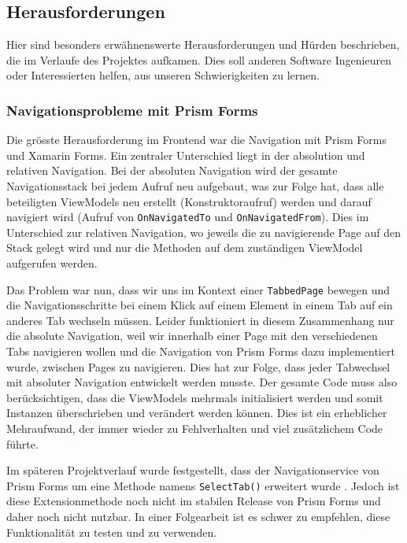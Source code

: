 \subsection{Herausforderungen}
Hier sind besonders erwähnenswerte Herausforderungen und Hürden beschrieben, die im Verlaufe des Projektes aufkamen. Dies soll anderen Software Ingenieuren oder Interessierten helfen, aus unseren Schwierigkeiten zu lernen. 


\subsubsection{Navigationsprobleme mit Prism Forms}\label{subsub:navigation}

Die grösste Herausforderung im Frontend war die Navigation mit Prism Forms und Xamarin Forms. Ein zentraler Unterschied liegt in der absolution und relativen Navigation. Bei der absoluten Navigation wird der gesamte Navigationsstack bei jedem Aufruf neu aufgebaut, was zur Folge hat, dass alle beteiligten ViewModels neu erstellt (Konstruktoraufruf) werden und darauf navigiert wird (Aufruf von \texttt{OnNavigatedTo} und \texttt{OnNavigatedFrom}). Dies im Unterschied zur relativen Navigation, wo jeweils die zu navigierende Page auf den Stack gelegt wird und nur die Methoden auf dem zuständigen ViewModel aufgerufen werden. 

Das Problem war nun, dass wir uns im Kontext einer \texttt{TabbedPage} bewegen und die Navigationsschritte bei einem Klick auf einem Element in einem Tab auf ein anderes Tab wechseln müssen. Leider funktioniert in diesem Zusammenhang nur die absolute Navigation, weil wir innerhalb einer Page mit den verschiedenen Tabs navigieren wollen und die Navigation von Prism Forms dazu implementiert wurde, zwischen Pages zu navigieren. Dies hat zur Folge, dass jeder Tabwechsel mit absoluter Navigation entwickelt werden musste. Der gesamte Code muss also berücksichtigen, dass die ViewModels mehrmals initialisiert werden und somit Instanzen überschrieben und verändert werden können. Dies ist ein erheblicher Mehraufwand, der immer wieder zu Fehlverhalten und viel zusätzlichem Code führte. 

Im späteren Projektverlauf wurde festgestellt, dass der Navigationservice von Prism Forms um eine Methode namens \texttt{SelectTab()} erweitert wurde \cite{prism-selecttab}. Jedoch ist diese Extensionmethode noch nicht im stabilen Release von Prism Forms und daher noch nicht nutzbar. In einer Folgearbeit ist es schwer zu empfehlen, diese Funktionalität zu testen und zu verwenden. 

